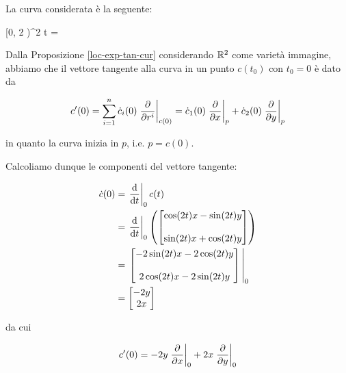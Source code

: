 {
La curva considerata è la seguente:

	{[0, 2 \pi)}{\R^{2}}
	{t}{%
		= %
		}

Dalla Proposizione \ref{loc-exp-tan-cur} considerando $ \mathbb{R}^{2} $ come varietà immagine, abbiamo che il vettore tangente alla curva in un punto $ c(t_{0}) $ con $ t_{0} = 0 $ è dato da

\begin{equation}
	c'(0) = \sum_{i=1}^{n} \dot{c}_{i}(0) \eval{ \pdv{r^{i}} }_{c(0)} %
	= \dot{c}_{1}(0) \eval{ \pdv{x} }_{p} + \dot{c}_{2}(0) \eval{ \pdv{y} }_{p}
\end{equation}

in quanto la curva inizia in $ p $, i.e. $ p = c(0) $.

Calcoliamo dunque le componenti del vettore tangente:

\begin{align}
	\begin{split}
		\dot{c}(0) &= \eval{ \dv{t} }_{0} c(t) \\
		&= \eval{ \dv{t} }_{0} \left( \bmqty{ \cos(2t) x - \sin(2t) y \\ \\ \sin(2t) x + \cos(2t) y } \right) \\
		&= \eval{ \bmqty{ - 2 \sin(2t) x - 2 \cos(2t) y \\ \\ 2 \cos(2t) x - 2 \sin(2t) y } }_{0} \\
		&= \bmqty{ - 2 y \\ 2x }
	\end{split}
\end{align}

da cui

\begin{equation}
	c'(0) = - 2 y \eval{ \pdv{x} }_{0} + 2 x \eval{ \pdv{y} }_{0}
\end{equation}
}


